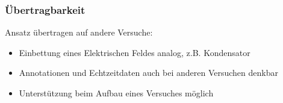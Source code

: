 \subsubsection{Übertragbarkeit}
Ansatz übertragen auf andere Versuche:
\begin{itemize}
	\item Einbettung eines Elektrischen Feldes analog, z.B. Kondensator
	\item Annotationen und Echtzeitdaten auch bei anderen Versuchen denkbar
	\item Unterstützung beim Aufbau eines Versuches möglich
\end{itemize}
	
	
	
	
	
	
	
	
	
	
	
	
	
	